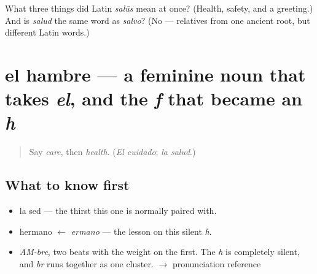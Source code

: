 \begin{tcolorbox}[breakable,colback=teal!4,colframe=teal!35!black,title={Before you move on}]
What three things did Latin \emph{salūs} mean at once? (Health, safety, and a greeting.) And is \emph{salud} the same word as \emph{salvo}? (No — relatives from one ancient root, but different Latin words.)
\end{tcolorbox}
\section[el hambre]{el hambre — a feminine noun that takes \emph{el}, and the \emph{f} that became an \emph{h}}

\label{lesson:ES-C334-hambre}



\begin{quote}
Say \emph{care}, then \emph{health}. (\emph{El cuidado}; \emph{la salud}.)
\end{quote}

\subsection*{What to know first}
\begin{itemize}
\raggedright
  \item la sed — the thirst this one is normally paired with.
  \item hermano $\leftarrow$ \emph{ermano} — the lesson on this silent \emph{h}.
\end{itemize}

\begin{sounds}
\begin{itemize}
\raggedright
  \item \emph{AM-bre}, two beats with the weight on the first. The \emph{h} is completely silent, and \emph{br} runs together as one cluster. $\to$ pronunciation reference
\end{itemize}
\end{sounds}

